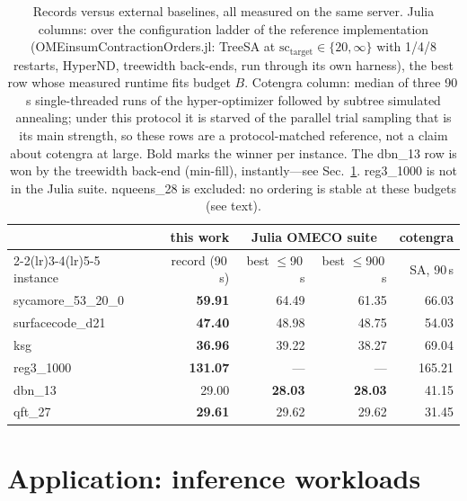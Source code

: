 \documentclass{SciPost}
\newcommand{\scT}{\ensuremath{\mathrm{sc}_{\mathrm{target}}}}
\begin{document}
\begin{table}[t]
\centering
\small
\begin{tabular}{lrrrr}
\toprule
 & this work &
 \multicolumn{2}{c}{Julia OMECO suite} & cotengra \\
\cmidrule(lr){2-2}\cmidrule(lr){3-4}\cmidrule(lr){5-5}
instance & record (90\,s) & best $\le$90\,s & best $\le$900\,s &
SA, 90\,s \\
\midrule
sycamore\_53\_20\_0 & \textbf{59.91} & 64.49 & 61.35 & 66.03 \\
surfacecode\_d21    & \textbf{47.40} & 48.98 & 48.75 & 54.03 \\
ksg                 & \textbf{36.96} & 39.22 & 38.27 & 69.04 \\
reg3\_1000          & \textbf{131.07} & --- & --- & 165.21 \\
dbn\_13             & 29.00 & \textbf{28.03} & \textbf{28.03} & 41.15 \\
qft\_27             & \textbf{29.61} & 29.62 & 29.62 & 31.45 \\
\bottomrule
\end{tabular}
\caption{Records versus external baselines, all measured on the same
server. Julia columns: over the configuration ladder of the reference
implementation (OMEinsumContractionOrders.jl: TreeSA at
$\scT \in \{20, \infty\}$ with 1/4/8 restarts, HyperND, treewidth
back-ends, run through its own harness), the best row whose measured
runtime fits budget $B$. Cotengra column: median of three 90\,s
single-threaded runs of the hyper-optimizer followed by
subtree simulated annealing; under this protocol it is starved of the
parallel trial sampling that is its main strength, so these rows are a
protocol-matched reference, not a claim about cotengra at large. Bold
marks the winner per instance. The dbn\_13 row is won by the treewidth
back-end (min-fill), instantly---see Sec.~\ref{sec:inference}.
reg3\_1000 is not in the Julia suite. nqueens\_28 is excluded: no
ordering is stable at these budgets (see text).}
\label{tab:external}
\end{table}

\section{Application: inference workloads}
\label{sec:inference}
\end{document}
